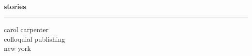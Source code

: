 \documentclass[openleft,10pt]{article}
\begin{document}
%
\hspace*{-0.125in}
%
\begin{minipage}[t][9.861in][t]{0.694in}
   \vspace*{-3in}
   \hspace*{0.125in}%
\end{minipage}%
%   
\begin{minipage}[t][9.861in][t]{6.625in}
  \noindent
  \vspace*{-3in} \mbox{ }
  \\
  \hspace*{1.625in} {\fontsize{86}{52}\sffamily\bfseries stories} \qquad
  \\[-4pt]
  \hspace*{1in}\rule{4.375in}{1.5pt}%
  \vspace*{2pt}
  \hspace*{3.115in} {\fontsize{24}{52}\sffamily carol carpenter} \qquad
  \\[5.5in]
  \hspace*{3.625in} {\sffamily\large colloquial publishing} \qquad
  \\
  \hspace*{4.585in} {\sffamily new york} \qquad
\end{minipage}
\vspace*{-8in}
\hspace*{-20in}
\end{document}
